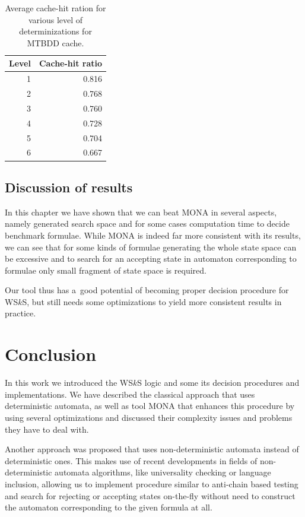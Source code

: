 \begin{table}[h!]
 \begin{center}
  \begin{tabular}{| r | r |}
  \hline
   \textbf{Level} & \textbf{Cache-hit ratio}\\
   \hline
   \hline
   1 & 0.816\\
   \hline
   2 & 0.768\\
   \hline
   3 & 0.760\\
   \hline
   4 & 0.728\\
   \hline
   5 & 0.704\\
   \hline
   6 & 0.667\\
   \hline
  \end{tabular}
 \end{center}
 \caption{Average cache-hit ration for various level of determinizations for
 MTBDD cache.}\label{cache-hits}
\end{table}

\section{Discussion of results}

In this chapter we have shown that we can beat
\textsc{MONA} in several aspects, namely generated search space and for some
cases computation time to decide benchmark formulae. While \textsc{MONA} is
indeed far more consistent with its results, we can see that for some kinds of
formulae generating the whole state space can be excessive and to search for an
accepting state in automaton corresponding to formulae only small fragment of
state space is required. 

Our tool thus has a~good potential of becoming proper decision procedure for
WS$k$S, but still needs some optimizations to yield more consistent results in practice. 

\chapter{Conclusion}\label{summary}

In this work we introduced the WS$k$S logic and some its decision procedures
and implementations.
We have described the classical approach that uses deterministic automata, as well
as tool \textsc{MONA} that enhances this procedure by using several optimizations and
discussed their complexity issues and problems they have to deal with.

Another approach was proposed that uses non-deterministic automata instead of
deterministic ones. This makes use of recent developments in fields of
non-deterministic automata algorithms, like universality checking or language
inclusion, allowing us to implement procedure similar to anti-chain based
testing \cite{tacas} and search for rejecting or accepting states on-the-fly
without need to construct the automaton corresponding to the given formula at
all.

